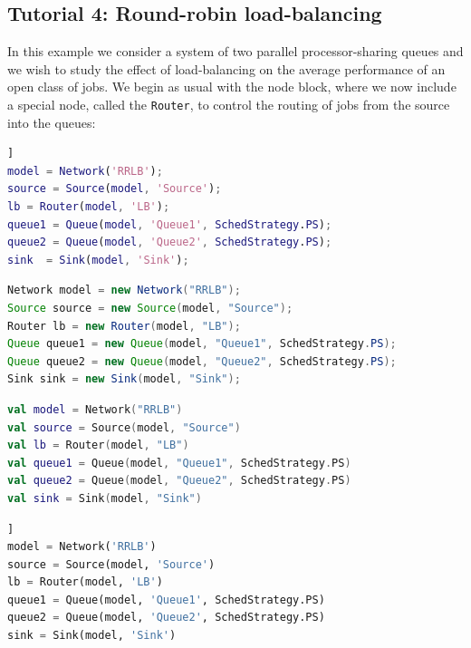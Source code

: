 \subsection{Tutorial 4: Round-robin load-balancing}
\label{example-4-round-robin-load-balancing}
In this example we consider a system of two parallel processor-sharing queues and we wish to study the effect of load-balancing on the average performance of an open class of jobs. We begin as usual with the node block, where we now include a special node, called the \texttt{Router}, to control the routing of jobs from the source into the queues:
\begin{MATLAB}
\begin{lstlisting}[language = matlab, basicstyle=\ttfamily\scriptsize]]
model = Network('RRLB');
source = Source(model, 'Source');
lb = Router(model, 'LB');
queue1 = Queue(model, 'Queue1', SchedStrategy.PS);
queue2 = Queue(model, 'Queue2', SchedStrategy.PS);
sink  = Sink(model, 'Sink');
\end{lstlisting}
\end{MATLAB}
\begin{JAVA}
\begin{lstlisting}[language = java, basicstyle=\ttfamily\scriptsize]
Network model = new Network("RRLB");
Source source = new Source(model, "Source");
Router lb = new Router(model, "LB");
Queue queue1 = new Queue(model, "Queue1", SchedStrategy.PS);
Queue queue2 = new Queue(model, "Queue2", SchedStrategy.PS);
Sink sink = new Sink(model, "Sink");
\end{lstlisting}
\end{JAVA}
\begin{KOTLIN}
\begin{lstlisting}[language = kotlin, basicstyle=\ttfamily\scriptsize]
val model = Network("RRLB")
val source = Source(model, "Source")
val lb = Router(model, "LB")
val queue1 = Queue(model, "Queue1", SchedStrategy.PS)
val queue2 = Queue(model, "Queue2", SchedStrategy.PS)
val sink = Sink(model, "Sink")
\end{lstlisting}
\end{KOTLIN}
\begin{PYTHON}
\begin{lstlisting}[language = python, basicstyle=\ttfamily\scriptsize]]
model = Network('RRLB')
source = Source(model, 'Source')
lb = Router(model, 'LB')
queue1 = Queue(model, 'Queue1', SchedStrategy.PS)
queue2 = Queue(model, 'Queue2', SchedStrategy.PS)
sink = Sink(model, 'Sink')
\end{lstlisting}
\end{PYTHON}
